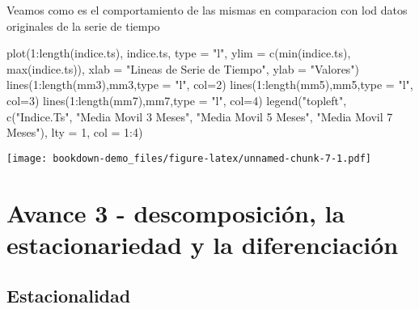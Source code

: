 \documentclass[
]{book}
\newenvironment{Shaded}{\begin{snugshade}}{\end{snugshade}}
\newcommand{\AttributeTok}[1]{\textcolor[rgb]{0.77,0.63,0.00}{#1}}
\newcommand{\DecValTok}[1]{\textcolor[rgb]{0.00,0.00,0.81}{#1}}
\newcommand{\FunctionTok}[1]{\textcolor[rgb]{0.00,0.00,0.00}{#1}}
\newcommand{\NormalTok}[1]{#1}
\newcommand{\SpecialCharTok}[1]{\textcolor[rgb]{0.00,0.00,0.00}{#1}}
\newcommand{\StringTok}[1]{\textcolor[rgb]{0.31,0.60,0.02}{#1}}
\begin{document}
Veamos como es el comportamiento de las mismas en comparacion con lod datos originales de la serie de tiempo

\begin{Shaded}
\begin{Highlighting}[]
\FunctionTok{plot}\NormalTok{(}\DecValTok{1}\SpecialCharTok{:}\FunctionTok{length}\NormalTok{(indice.ts), indice.ts, }\AttributeTok{type =} \StringTok{"l"}\NormalTok{,   }
     \AttributeTok{ylim =} \FunctionTok{c}\NormalTok{(}\FunctionTok{min}\NormalTok{(indice.ts), }\FunctionTok{max}\NormalTok{(indice.ts)),}
     \AttributeTok{xlab =} \StringTok{"Lineas de Serie de Tiempo"}\NormalTok{, }\AttributeTok{ylab =} \StringTok{"Valores"}\NormalTok{)}
\FunctionTok{lines}\NormalTok{(}\DecValTok{1}\SpecialCharTok{:}\FunctionTok{length}\NormalTok{(mm3),mm3,}\AttributeTok{type =} \StringTok{"l"}\NormalTok{, }\AttributeTok{col=}\DecValTok{2}\NormalTok{)}
\FunctionTok{lines}\NormalTok{(}\DecValTok{1}\SpecialCharTok{:}\FunctionTok{length}\NormalTok{(mm5),mm5,}\AttributeTok{type =} \StringTok{"l"}\NormalTok{, }\AttributeTok{col=}\DecValTok{3}\NormalTok{)}
\FunctionTok{lines}\NormalTok{(}\DecValTok{1}\SpecialCharTok{:}\FunctionTok{length}\NormalTok{(mm7),mm7,}\AttributeTok{type =} \StringTok{"l"}\NormalTok{, }\AttributeTok{col=}\DecValTok{4}\NormalTok{)}
\FunctionTok{legend}\NormalTok{(}\StringTok{"topleft"}\NormalTok{,}
       \FunctionTok{c}\NormalTok{(}\StringTok{"Indice.Ts"}\NormalTok{, }\StringTok{"Media Movil 3 Meses"}\NormalTok{, }\StringTok{"Media Movil 5 Meses"}\NormalTok{, }\StringTok{"Media Movil 7 Meses"}\NormalTok{),}
       \AttributeTok{lty =} \DecValTok{1}\NormalTok{, }\AttributeTok{col =} \DecValTok{1}\SpecialCharTok{:}\DecValTok{4}\NormalTok{)}
\end{Highlighting}
\end{Shaded}

\texttt{[image: bookdown-demo\_files/figure-latex/unnamed-chunk-7-1.pdf]}

\hypertarget{avance-3---descomposiciuxf3n-la-estacionariedad-y-la-diferenciaciuxf3n}{%
\chapter{Avance 3 - descomposición, la estacionariedad y la diferenciación}\label{avance-3---descomposiciuxf3n-la-estacionariedad-y-la-diferenciaciuxf3n}}

\hypertarget{Estacion}{%
\section{Estacionalidad}\label{Estacion}}
\end{document}
